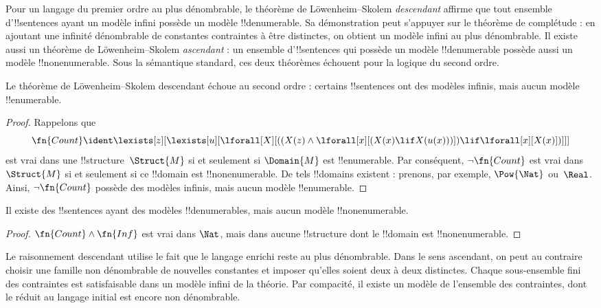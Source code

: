 \documentclass[../../../include/open-logic-section]{subfiles}
\begin{document}


\begin{explain}
Pour un langage du premier ordre au plus
dénombrable, le théorème de Löwenheim--Skolem
\emph{descendant} affirme que tout ensemble
d'!!{sentence}s ayant un modèle infini possède
un modèle !!{denumerable}. Sa démonstration
peut s'appuyer sur le théorème de complétude :
en ajoutant une infinité dénombrable de constantes contraintes à être
distinctes, on obtient un modèle infini au plus
dénombrable. Il existe aussi un théorème de
Löwenheim--Skolem \emph{ascendant} : un ensemble
d'!!{sentence}s qui possède un modèle
!!{denumerable} possède aussi un modèle
!!{nonenumerable}. Sous la sémantique standard,
ces deux théorèmes échouent pour la logique du
second ordre.
\end{explain}

\begin{thm}
Le théorème de Löwenheim--Skolem descendant
échoue au second ordre : certains !!{sentence}s
ont des modèles infinis, mais aucun modèle
!!{enumerable}.
\end{thm}

\begin{proof}
Rappelons que
\[
\fn{Count} \ident \lexists[z][\lexists[u][\lforall[X][((X(z) \land
      \lforall[x][(X(x) \lif X(u(x)))]) \lif \lforall[x][X(x)])]]]
\]
est vrai dans une !!{structure}~$\Struct{M}$
si et seulement si $\Domain{M}$ est
!!{enumerable}. Par conséquent,
$\lnot\fn{Count}$ est vrai dans~$\Struct{M}$
si et seulement si ce !!{domain} est
!!{nonenumerable}. De tels !!{domain}s
existent : prenons, par exemple,
$\Pow{\Nat}$ ou~$\Real$.
Ainsi, $\lnot\fn{Count}$ possède des modèles
infinis, mais aucun modèle !!{enumerable}.
\end{proof}

\begin{thm}
Il existe des !!{sentence}s ayant des modèles
!!{denumerable}s, mais aucun modèle
!!{nonenumerable}.
\end{thm}

\begin{proof}
$\fn{Count}\land\fn{Inf}$ est vrai dans
$\Nat$, mais dans aucune !!{structure}
dont le !!{domain} est !!{nonenumerable}.
\end{proof}

Le raisonnement descendant utilise le fait que le langage enrichi
reste au plus dénombrable. Dans le sens ascendant, on peut
au contraire choisir une famille non dénombrable de nouvelles
constantes et imposer qu'elles soient deux à deux distinctes.
Chaque sous-ensemble fini des contraintes est satisfaisable
dans un modèle infini de la théorie. Par compacité, il existe
un modèle de l'ensemble des contraintes, dont le réduit
au langage initial est encore non dénombrable.
\end{document}
